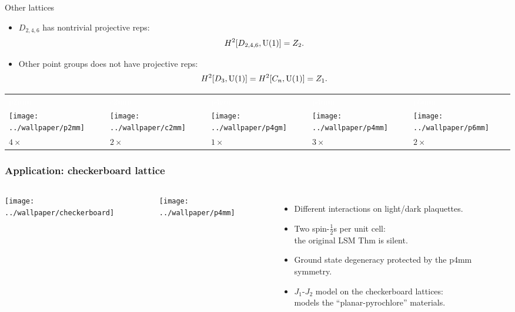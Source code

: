 \documentclass[xcolor=table, 10pt, aspectratio=43]{beamer}
\renewcommand{\arraystretch}{1.5}
\begin{document}
\begin{frame}{Other lattices}
  \begin{itemize}
    \item $D_{2,4,6}$ has nontrivial projective reps:
    \[H^2[D_{2,4,6}, \text U(1)] = Z_2.\]
    \item Other point groups does not have projective reps:
    \[H^2[D_3, \text U(1)] = H^2[C_n, \text U(1)] = Z_1.\]
  \end{itemize}
  \begin{table}
    \centering
    \renewcommand{\arraystretch}{1.5}
    \begin{tabularx}{\columnwidth}{xxxxx}
      \textcolor{white}{p2mm}
      &\textcolor{white}{c2mm}
      &\textcolor{white}{p4gm}
      &\textcolor{white}{p4mm}
      &\textcolor{white}{p6mm}\\
      \texttt{[image: ../wallpaper/p2mm]} &
      \texttt{[image: ../wallpaper/c2mm]} &
      \texttt{[image: ../wallpaper/p4gm]} &
      \texttt{[image: ../wallpaper/p4mm]} &
      \texttt{[image: ../wallpaper/p6mm]}\\
      $4\times$ & $2\times$ & $1\times$ & $3\times$ & $2\times$
    \end{tabularx}
  \end{table}
\end{frame}

\begin{frame}
  \frametitle{Application: checkerboard lattice}
  \begin{columns}
    \begin{center}
      \texttt{[image: ../wallpaper/checkerboard]}\\
    \end{center}
    \begin{center}
      \texttt{[image: ../wallpaper/p4mm]}
    \end{center}
    \begin{itemize}
    \item Different interactions on light/dark plaquettes.
    \item Two spin-$\frac12$s per unit cell:\\the original LSM Thm is silent.
    \item Ground state degeneracy protected by the p4mm symmetry.
    \item $J_1$-$J_2$ model on the checkerboard lattices:\\
    models the ``planar-pyrochlore'' materials.
    \end{itemize}
  \end{columns}
\end{frame}
\end{document}
